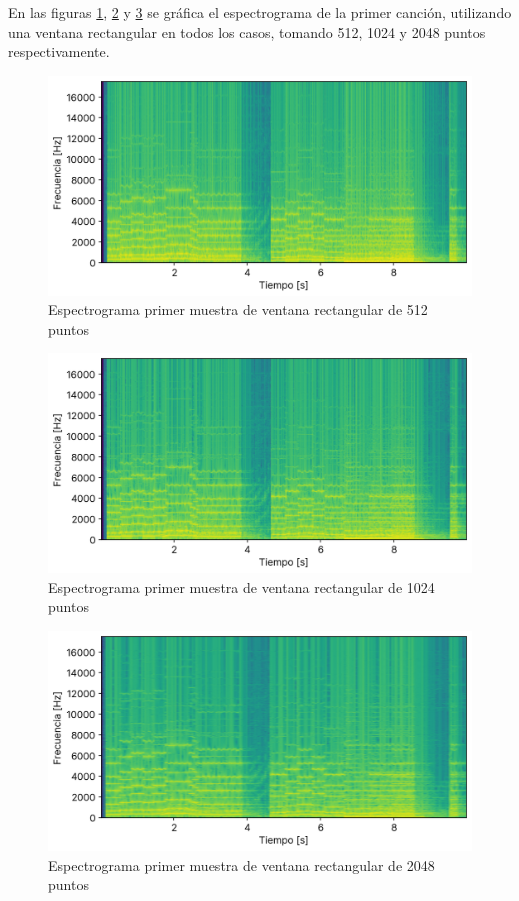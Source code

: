 \documentclass[12pt]{article}
\begin{document}
En las figuras \ref{cancion1_espectograma_boxcar_0512}, \ref{cancion1_espectograma_boxcar_1024} y \ref{cancion1_espectograma_boxcar_2048} se gráfica el espectrograma de la primer canción, utilizando una ventana rectangular en todos los casos, tomando 512, 1024 y 2048 puntos respectivamente.

\begin{figure}[H]
\centering
\includegraphics{plot/cancion1_espectograma_boxcar_0512.png}
\caption{Espectrograma primer muestra de ventana rectangular de 512 puntos}
\label{cancion1_espectograma_boxcar_0512}
\end{figure}

\begin{figure}[H]
\centering
\includegraphics{plot/cancion1_espectograma_boxcar_1024.png}
\caption{Espectrograma primer muestra de ventana rectangular de 1024 puntos}
\label{cancion1_espectograma_boxcar_1024}
\end{figure}

\begin{figure}[H]
\centering
\includegraphics{plot/cancion1_espectograma_boxcar_2048.png}
\caption{Espectrograma primer muestra de ventana rectangular de 2048 puntos}
\label{cancion1_espectograma_boxcar_2048}
\end{figure}
\end{document}
